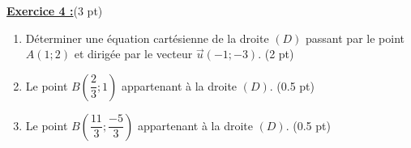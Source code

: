 \documentclass[12pt,a4paper]{article}
\begin{document}
\underline{\large\textbf{Exercice 4 :}}(3 pt)
\begin{enumerate}
	\item Déterminer une équation cartésienne de la droite $(D)$ passant par le point $A(1;2)$ et dirigée par le vecteur $\vec{u}(-1;-3)$. (2 pt)
	\item Le point $B\left(\dfrac{2}{3}; 1\right)$ appartenant à la droite $(D)$. (0.5 pt)
	\item Le point $B\left(\dfrac{11}{3}; \dfrac{-5}{3}\right)$ appartenant à la droite $(D)$. (0.5 pt)
\end{enumerate}
\end{document}
